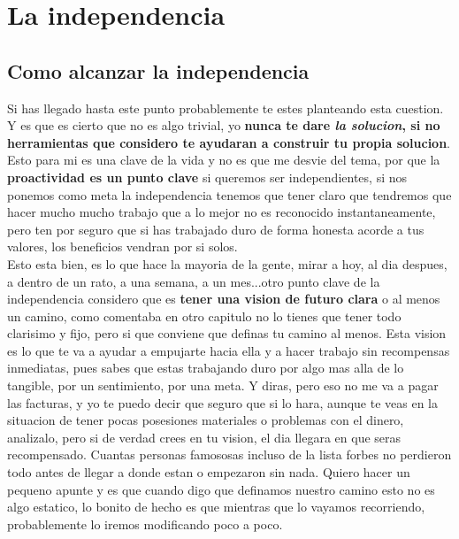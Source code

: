 \chapter{La independencia}
\section{Como alcanzar la independencia}
Si has llegado hasta este punto probablemente te estes planteando esta cuestion. Y es que es cierto que no es algo trivial, yo \textbf{nunca te dare \textit{la solucion}, si no herramientas que considero te ayudaran a construir tu propia solucion}.\\

Esto para mi es una clave de la vida y no es que me desvie del tema, por que la \textbf{proactividad es un punto clave} si queremos ser independientes, si nos ponemos como meta la independencia tenemos que tener claro que tendremos que hacer mucho mucho trabajo que a lo mejor no es reconocido instantaneamente, pero ten por seguro que si has trabajado duro de forma honesta acorde a tus valores, los beneficios vendran por si solos.\\

Esto esta bien, es lo que hace la mayoria de la gente, mirar a hoy, al dia despues, a dentro de un rato, a una semana, a un mes...otro punto clave de la independencia considero que es \textbf{tener una vision de futuro clara} o al menos un camino, como comentaba en otro capitulo no lo tienes que tener todo clarisimo y fijo, pero si que conviene que definas tu camino al menos. Esta vision es lo que te va a ayudar a empujarte hacia ella y a hacer trabajo sin recompensas inmediatas, pues sabes que estas trabajando duro por algo mas alla de lo tangible, por un sentimiento, por una meta. Y diras, pero eso no me va a pagar las facturas, y yo te puedo decir que seguro que si lo hara, aunque te veas en la situacion de tener pocas posesiones materiales o problemas con el dinero, analizalo, pero si de verdad crees en tu vision, el dia llegara en que seras recompensado. Cuantas personas famososas incluso de la lista forbes no perdieron todo antes de llegar a donde estan o empezaron sin nada. Quiero hacer un pequeno apunte y es que cuando digo que definamos nuestro camino esto no es algo estatico, lo bonito de hecho es que mientras que lo vayamos recorriendo, probablemente lo iremos modificando poco a poco.\\

